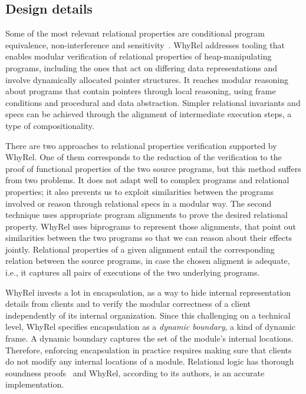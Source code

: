 \subsection{Design details}
\label{subsec:whyrel_deisgn}

Some of the most relevant relational properties are conditional program equivalence, non-interference and sensitivity~\cite{barthe2019verifying}.
WhyRel addresses tooling that enables modular verification of relational properties of heap-manipulating programs, including the ones that act on differing data representations and involve dynamically allocated pointer structures.
It reaches modular reasoning about programs that contain pointers through local reasoning, using frame conditions and procedural and data abstraction.
Simpler relational invariants and specs can be achieved through the alignment of intermediate execution steps, a type of compositionality.

There are two approaches to relational properties verification supported by WhyRel.
One of them corresponds to the reduction of the verification to the proof of functional properties of the two source programs, but this method suffers from two problems.
It does not adapt well to complex programs and relational properties; it also prevents us to exploit similarities between the programs involved or reason through relational specs in a modular way.
The second technique uses appropriate program alignments to prove the desired relational property.
WhyRel uses biprograms to represent those alignments, that point out similarities between the two programs so that we can reason about their effects jointly.
Relational properties of a given alignment entail the corresponding relation between the source programs, in case the chosen aligment is adequate, i.e., it captures all pairs of executions of the two underlying programs.

WhyRel invests a lot in encapsulation, as a way to hide internal representation details from clients and to verify the modular correctness of a client independently of its internal organization.
Since this challenging on a technical level, WhyRel specifies encapsulation as a \emph{dynamic boundary}, a kind of dynamic frame.
A dynamic boundary captures the set of the module's internal locations.
Therefore, enforcing encapsulation in practice requires making sure that clients do not modify any internal locations of a module.
Relational logic has thorough soundness proofs~\cite{10.1145/3551497} and WhyRel, according to its authors, is an accurate implementation.



